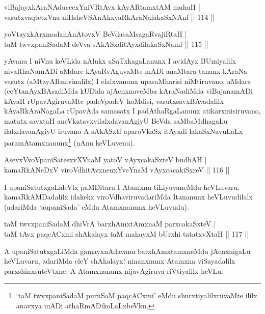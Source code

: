 \begin{shl}
viBajayxkAraNAducecxYniVRtAvx kAyARtamxtAM muhuH |\\
vasutxvaqtetxVna niHsheVSAnAkxyaRkAraNalakaSxNAnf \hfill || 114 ||
\end{shl}

\begin{shl}
yoV\s tayxkArxmadanAnAtovxV BeVdasaMsagaRvajiRtaH |\\
taM twvxpaniSadaM deVva sAkASxditAyxdilakaSxNamf \hfill || 115 ||
\end{shl}

\begin{artha}
yAvanu I niVnu keVLida nAlukx aSaTxkagaLanunx I avidAyx BUmiyalilx nivaRhaNamADi aMdare kAyaRvAguvaMte mADi anaMtara tananx kAraNa vasutx (aMtayARmivinalilx) I elalxvanunx upasaMharisi niMtiruvano. aMdare (ceYtanAyxBAsadiMda kUDida ajAcnxnaveMba kAraNadiMda viBajanamADi kAyaR rUpavAgiruvaMte padeVpadeV hoMdisi, vasutxsavxBAvadalilx kAyaRkAraNagaLa rUpavAda samasatx I padAthaRgaLanunx atikarxmisiruvano, matutx savxtaH aneVkatavxvilalxdavanAgiyU BeVda saMbaMdhagaLu ilalxdavanAgiyU iruvano A sAkASxtf aparoVkaSx itAyxdi lakaSxNavuLaLx paramAtamxnanunx\footnote{`taM twvxpaniSadaM puruSaM paqcACxmi' eMdu shurxtiyalilxruvaMte ililx anavxya mADi athaRmADikoLaLxbeVku.} (nAnu keVLuvenu).
\end{artha}%


\begin{shl}
AsevxVvoVpaniSatesxvXVnaM yatoV vAyxcakaSxteV budhAH |\\
kamaRkANeDxV viroVdhitAvxnenxYveYnaM vAyxcacakiSxreV \hfill || 116 ||
\end{shl}

\begin{artha}
I upaniSatutxgaLaleVlx paMDitaru I Atamxnu tiLiyuvaneMdu heVLuvaru. kamaRkAMDadalilx idakekx viroVdhaviruvadariMda Itananunx heVLuvudilalx (adariMda `aupaniSada' eMdu Atamxnanunx heVLuvudu).
\end{artha}


\begin{shl}
taM twvxpaniSadaM dhiVrA barxhAmxtAmxnaM parxcakaSxteV |\\
taM tAvx paqcACxmi shAkalayx taM mahayxM bUrxhi tatatxvXtaH \hfill || 117 ||
\end{shl}

\begin{artha}
A upaniSatutxgaLiMda gamayxnAdavanu barxhAmxtamxneMdu jAcnxnigaLu heVLuvaru, adariMda eleY shAkalayx! ninanxnunx Atamxna viSayadalilx parxshinxsuteVtxne, A Atamxnanunx nijavAgiruva riVtiyalilx heVLu.
\end{artha}

